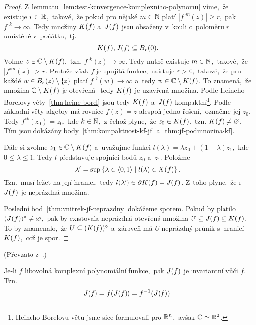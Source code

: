 \begin{proof}
    Z~lemmatu~\ref{lem:test-konvergence-komplexniho-polynomu} víme,~že existuje $r\in\mathbb{R}$,~takové,~že pokud pro nějaké $m\in\mathbb{N}$ platí $|f^{\circ m}(z)|\geqslant r$,~pak $f^{\circ k}\to\infty$. Tedy množiny $K(f)$ a~$J(f)$ jsou obsaženy v~kouli o~poloměru $r$ umístěné v~počátku,~tj.
    \[K(f),J(f)\subseteq B_r(0).\]
    Volme $z\in\mathbb{C}\setminus K(f)$,~tzn. $f^{\circ k}(z)\to\infty$. Tedy nutně existuje $m\in\mathbb{N}$,~takové,~že $|f^{\circ m}(z)|>r$. Protože však $f$ je spojitá funkce,~existuje $\varepsilon>0$,~takové,~že pro každé $w\in B_\varepsilon(z)\setminus\left\{z\right\}$ platí $f^{\circ k}(w)\to\infty$ a~tedy $w\in\mathbb{C}\setminus K(f)$. To znamená,~že množina $\mathbb{C}\setminus K(f)$ je otevřená,~tedy $K(f)$ je uzavřená množina. Podle Heineho-Borelovy věty~\ref{thm:heine-borel} jsou tedy $K(f)$ a~$J(f)$ kompaktní\footnote{Heineho-Borelovu větu jsme sice formulovali pro $\mathbb{R}^n$,~avšak $\mathbb{C}\simeq\mathbb{R}^2$.}. Podle základní věty algebry má rovnice $f(z)=z$ alespoň jedno řešení,~označme jej $z_0$. Tedy $f^{\circ k}(z_0)=z_0$,~kde $k\in\mathbb{N}$,~z čehož plyne,~že $z_0\in K(f)$,~tzn. $K(f)\neq\varnothing$. Tím jsou dokázány body~\ref{thm:kompaktnost-kf-jf} a~\ref{thm:jf-podmnozina-kf}.
    
    Dále si zvolme $z_1\in\mathbb{C}\setminus K(f)$ a~uvažujme funkci $l(\lambda)=\lambda z_0+(1-\lambda)z_1$,~kde $0\leqslant\lambda\leqslant 1$. Tedy $l$ představuje spojnici bodů $z_0$ a~$z_1$. Položme
    \[\lambda^\prime=\sup\left\{\lambda\in\langle0,1\rangle\mid l(\lambda)\in K(f)\right\}.\]
    Tzn.~musí ležet na její hranici,~tedy $l(\lambda^\prime)\in\partial K(f)=J(f)$. Z~toho plyne,~že i~$J(f)$ je neprázdná množina.

    Poslední bod~\ref{thm:vnitrek-jf-neprazdny} dokážeme sporem. Pokud by platilo  $(J(f))^\circ\neq\varnothing$,~pak by existovala neprázdná otevřená množina $U\subseteq J(f)\subseteq K(f)$. To by znamenalo,~že $U\subseteq(K(f))^\circ$ a~zároveň má $U$ neprázdný průnik s~hranicí $K(f)$,~což je spor.
\end{proof}
(Převzato z~\citep[str. 237]{Falconer1989}.)
\begin{theorem}\label{invariance-jf}
    Je-li $f$ libovolná komplexní polynomiální funkce,~pak $J(f)$ je invariantní vůči $f$. Tzn.
    \[J(f)=f(J(f))=f^{-1}(J(f)).\]
\end{theorem}
